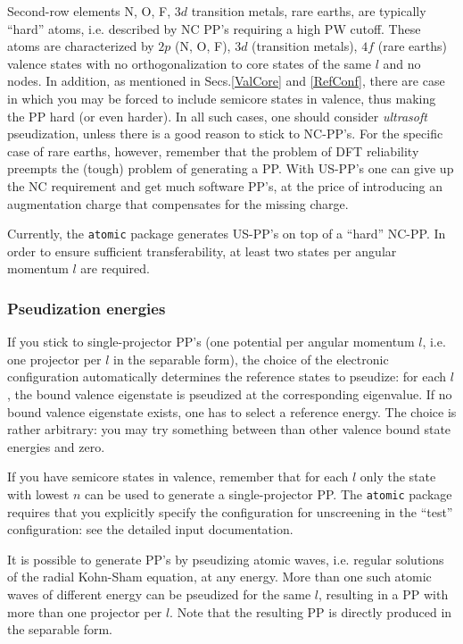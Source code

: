 \documentclass[12pt]{article}
\begin{document}
Second-row elements N, O, F, $3d$ transition metals, rare earths, 
are typically ``hard'' atoms, i.e. described by NC PP's requiring
a high PW cutoff. These atoms are characterized by $2p$ (N, O, F), 
$3d$ (transition metals), $4f$ (rare earths) valence states with no 
orthogonalization to core states of the same $l$ and no nodes.
In addition, as mentioned in Secs.\ref{ValCore} and \ref{RefConf}, 
there are case in which you may be forced to include semicore states
in valence, thus making the PP hard (or even harder).  
In all such cases, one should consider 
{\em ultrasoft} pseudization, unless there is a good reason to stick
to NC-PP's. For the specific case of rare earths, however, remember 
that the problem of DFT reliability preempts the (tough) problem of 
generating a PP. With US-PP's one can give up the NC requirement
and get much software PP's, at the price of introducing an augmentation 
charge that compensates for the missing charge. 

Currently, the \texttt{atomic} package generates US-PP's on top of
a ``hard'' NC-PP. In order to ensure sufficient transferability, 
at least two states per angular momentum $l$ are required. 

\subsubsection{Pseudization energies}
\label{pseudiz}
If you stick to single-projector PP's (one potential per angular momentum 
$l$, i.e. one projector per $l$ in the separable form), the choice of the 
electronic configuration automatically determines the reference states
to pseudize: for each $l$, the bound valence eigenstate is pseudized
at the corresponding eigenvalue. If no bound valence eigenstate exists,
one has to select a reference energy. The choice is rather arbitrary:
you may try something between than other valence bound state energies
and zero. 

If you have semicore states in valence, remember that for each $l$
only the state with lowest $n$ can be used to generate a single-projector
PP. The \texttt{atomic} package requires that you explicitly specify the 
configuration for unscreening in the ``test'' configuration:
see the detailed input documentation.

It is possible to generate PP's by pseudizing atomic waves,
i.e. regular solutions of the radial Kohn-Sham equation, at any
energy. More than one such atomic waves of different energy can be
pseudized for the same $l$, resulting in a PP with more than one 
projector per $l$. Note that the resulting PP is directly produced
in the separable form. 
\end{document}
